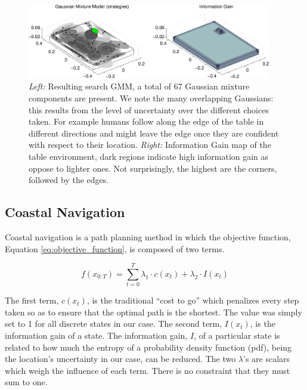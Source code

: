 \begin{figure}
\centering
  \includegraphics[width=0.95\textwidth]{./ch3-Search/Figures/Figure4}
  \caption{\textit{Left: } Resulting search GMM, a total of 67 Gaussian mixture components are present. We note the many overlapping Gaussians: this results
from the level of uncertainty over the different choices taken. For example humans follow along the edge of the table in different directions and might
leave the edge once they are confident with respect to their location. \textit{Right:} Information Gain map of the table environment, dark regions indicate 
high information gain as oppose to lighter ones. Not surprisingly, the highest are the corners, followed by the edges.}
  \label{fig:gmm}
\end{figure}

\subsection{Coastal Navigation}\label{chap3:costal_policy}

Coastal navigation \cite{CostalNavigation1999} is a path planning method in which the objective function, 
Equation \ref{eq:objective_function}, is composed of two terms.

\begin{equation}\label{eq:objective_function}
 f(x_{0:T}) = \sum\limits_{t=0}^{T} \lambda_1 \cdot c(x_t) + \lambda_2 \cdot I(x_t)
\end{equation}

The first term, $c(x_t)$, is the traditional ``cost to go'' which penalizes every step taken so as to ensure that the
optimal path is the shortest. The value was simply set to 1 for all discrete states in our case. The second term, $I(x_t)$, 
is the information gain of a state. The information gain, $I$, of a particular state is related to how much 
the entropy of a probability density function (pdf), being the location's uncertainty in our case, can be reduced. The two $\lambda$'s are scalars which weigh the influence 
of each term. There is no constraint that they must sum to one.


